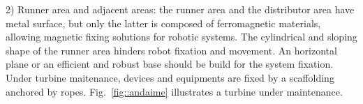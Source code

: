 




2) Runner area and adjacent areas: the runner area and the distributor area
have metal surface, but only the latter is composed of ferromagnetic materials,
allowing magnetic fixing solutions for robotic systems. The cylindrical
and sloping shape of the runner area hinders robot fixation and movement. An horizontal plane or an efficient and robust base should be build for the system fixation.
Under turbine maitenance, devices and equipments are fixed by a scaffolding
anchored by ropes. Fig.~\ref{fig::andaime} illustrates a turbine under
maintenance.


